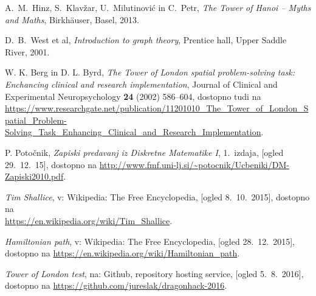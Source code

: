 \documentclass[twoside,11pt]{article}
\begin{document}
\begin{thebibliography}{99}
 A.\ M.\ Hinz, S.\ Klavžar, U.\ Milutinović in C.\ Petr, \emph{The Tower of Hanoi – Myths and Maths}, Birkhäuser, Basel, 2013.

 D.\ B.\ West et al, \emph{Introduction to graph theory}, Prentice hall, Upper Saddle River, 2001.

W. K. Berg in D. L. Byrd, \emph{The Tower of London spatial problem-solving task: Enchancing clinical and research implementation}, Journal of Clinical and Experimental Neuropsychology \textbf{24} (2002) 586--604,
dostopno tudi na \\ \url{https://www.researchgate.net/publication/11201010_The_Tower_of_London_Spatial_Problem-Solving_Task_Enhancing_Clinical_and_Research_Implementation}.

 P. Potočnik, \emph{Zapiski predavanj iz Diskretne Matematike I}, 1.~izdaja, [ogled 29.~12.~15], dostopno na \url{http://www.fmf.uni-lj.si/~potocnik/Ucbeniki/DM-Zapiski2010.pdf}.

 \emph{Tim Shallice}, v: Wikipedia: The Free Encyclopedia, [ogled 8.~10.~2015], dostopno na\\ \url{https://en.wikipedia.org/wiki/Tim_Shallice}.

 \emph{Hamiltonian path}, v: Wikipedia: The Free Encyclopedia, [ogled 28.~12.~2015], dostopno na \url{https://en.wikipedia.org/wiki/Hamiltonian_path}.

 \emph{Tower of London test}, na: Github, repository hosting service, [ogled 5.~8.~2016], dostopno na \url{https://github.com/jureslak/dragonhack-2016}.
\end{thebibliography}
\end{document}
